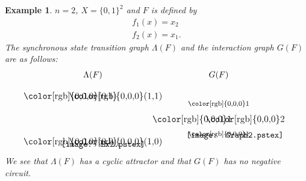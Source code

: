 \documentclass[11pt]{article}
\newtheorem{example}{Example}
\begin{document}
\begin{example} 
$n=2$, $X=\{0,1\}^2$ and $F$ is defined by 
\[
\begin{array}{l}
f_1(x)=x_2\\
f_2(x)=x_1.
\end{array}
\]
The synchronous state transition graph $\Lambda(F)$ and the
interaction graph $G(F)$ are as follows:
\[
\begin{array}{ccc}
\Lambda(F)&&G(F)\\[5mm]
\begin{array}{c}
\begin{picture}(0,0)\texttt{[image: Ex2.pstex]}\end{picture}\setlength{\unitlength}{3947sp}\begingroup\makeatletter\ifx\SetFigFont\undefined \gdef\SetFigFont#1#2#3#4#5{\reset@font\fontsize{#1}{#2pt}\fontfamily{#3}\fontseries{#4}\fontshape{#5}\selectfont}\fi\endgroup \begin{picture}(1253,1081)(2673,-4505)
\put(2850,-4456){\makebox(0,0)[b]{\smash{{\SetFigFont{11}{13.2}{\rmdefault}{\mddefault}{\updefault}{\color[rgb]{0,0,0}(0,0)}}}}}
\put(2850,-3556){\makebox(0,0)[b]{\smash{{\SetFigFont{11}{13.2}{\rmdefault}{\mddefault}{\updefault}{\color[rgb]{0,0,0}(0,1)}}}}}
\put(3750,-3556){\makebox(0,0)[b]{\smash{{\SetFigFont{11}{13.2}{\rmdefault}{\mddefault}{\updefault}{\color[rgb]{0,0,0}(1,1)}}}}}
\put(3750,-4456){\makebox(0,0)[b]{\smash{{\SetFigFont{11}{13.2}{\rmdefault}{\mddefault}{\updefault}{\color[rgb]{0,0,0}(1,0)}}}}}
\end{picture} \end{array}
&~~~~~~~~~~~~~&
\begin{array}{c}
\begin{picture}(0,0)\texttt{[image: Graph2.pstex]}\end{picture}\setlength{\unitlength}{3947sp}\begingroup\makeatletter\ifx\SetFigFont\undefined \gdef\SetFigFont#1#2#3#4#5{\reset@font\fontsize{#1}{#2pt}\fontfamily{#3}\fontseries{#4}\fontshape{#5}\selectfont}\fi\endgroup \begin{picture}(1278,715)(2737,-3879)
\put(2850,-3571){\makebox(0,0)[b]{\smash{{\SetFigFont{11}{13.2}{\rmdefault}{\mddefault}{\updefault}{\color[rgb]{0,0,0}1}}}}}
\put(3900,-3571){\makebox(0,0)[b]{\smash{{\SetFigFont{11}{13.2}{\rmdefault}{\mddefault}{\updefault}{\color[rgb]{0,0,0}2}}}}}
\put(3376,-3248){\makebox(0,0)[b]{\smash{{\SetFigFont{8}{9.6}{\rmdefault}{\mddefault}{\updefault}{\color[rgb]{0,0,0}$1$}}}}}
\put(3376,-3848){\makebox(0,0)[b]{\smash{{\SetFigFont{8}{9.6}{\rmdefault}{\mddefault}{\updefault}{\color[rgb]{0,0,0}$1$}}}}}
\end{picture} \end{array}
\end{array}
\]
We see that $\Lambda(F)$ has a cyclic attractor and that $G(F)$ has no
negative circuit.
\end{example}
\end{document}
